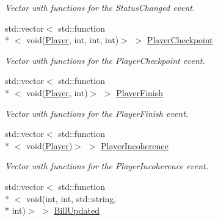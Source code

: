 \begin{DoxyCompactItemize}
\begin{DoxyCompactList}\small\item\em Vector with functions for the Status\-Changed event. \end{DoxyCompactList}\item 
\hypertarget{classPlugin_abc2ce0103b7783a4ff4b3009cb18af7b}{std\-::vector$<$ std\-::function\\*
$<$ void(\hyperlink{structPlayer}{Player}, int, int, int)$>$ $>$ \hyperlink{classPlugin_abc2ce0103b7783a4ff4b3009cb18af7b}{Player\-Checkpoint}}\label{classPlugin_abc2ce0103b7783a4ff4b3009cb18af7b}

\begin{DoxyCompactList}\small\item\em Vector with functions for the Player\-Checkpoint event. \end{DoxyCompactList}\item 
\hypertarget{classPlugin_a16aadb48218d18235979314d259699aa}{std\-::vector$<$ std\-::function\\*
$<$ void(\hyperlink{structPlayer}{Player}, int)$>$ $>$ \hyperlink{classPlugin_a16aadb48218d18235979314d259699aa}{Player\-Finish}}\label{classPlugin_a16aadb48218d18235979314d259699aa}

\begin{DoxyCompactList}\small\item\em Vector with functions for the Player\-Finish event. \end{DoxyCompactList}\item 
\hypertarget{classPlugin_abcc9fff7f98ac9a872a965f0809b7f53}{std\-::vector$<$ std\-::function\\*
$<$ void(\hyperlink{structPlayer}{Player})$>$ $>$ \hyperlink{classPlugin_abcc9fff7f98ac9a872a965f0809b7f53}{Player\-Incoherence}}\label{classPlugin_abcc9fff7f98ac9a872a965f0809b7f53}

\begin{DoxyCompactList}\small\item\em Vector with functions for the Player\-Incoherence event. \end{DoxyCompactList}\item 
\hypertarget{classPlugin_a44ef1f6774366dd3dcc588d7c7afbc8a}{std\-::vector$<$ std\-::function\\*
$<$ void(int, int, std\-::string, \\*
int)$>$ $>$ \hyperlink{classPlugin_a44ef1f6774366dd3dcc588d7c7afbc8a}{Bill\-Updated}}\label{classPlugin_a44ef1f6774366dd3dcc588d7c7afbc8a}


\end{DoxyCompactItemize}
